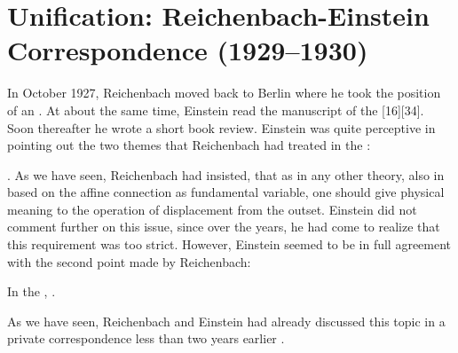 \documentclass[draft]{article}
\renewcommand{\me}{;~m.e.{}}
\newcommand{\PRZL}{\citetitle{Reichenbach1928}\xspace}
\begin{document}
\section{Unification: Reichenbach-Einstein Correspondence (1929--1930)}
\label{unification}
%
In October 1927, Reichenbach moved back to Berlin where he took the position of an  \citep{Hecht1982}.  At about the same time, Einstein read the manuscript of the \PRZL {}[16][34]. Soon thereafter he wrote a short book review. Einstein was quite perceptive in pointing out the two themes that Reichenbach had treated in the \Ap: \begin{inparaenum}[(1)] \item {} \citep[20\me]{Einstein1928d}. As we have seen, Reichenbach had insisted, that as in any other  theory, also in \uft based on the affine connection as fundamental variable, one should give physical meaning to the operation of displacement from the outset. Einstein did not comment further on this issue, since over the years, he had come to realize that this requirement was too strict. However, Einstein seemed to be in full agreement with the second point made by Reichenbach: \item In the \Ap,  \citep[20\me]{Einstein1928d}. \end{inparaenum} As we have seen, Reichenbach and Einstein had already discussed this topic in a private correspondence less than two years earlier . 

\end{document}
